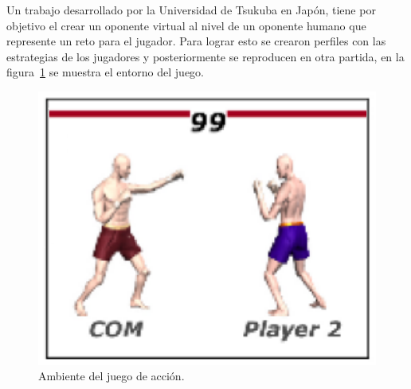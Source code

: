 
Un trabajo desarrollado por la Universidad de Tsukuba en
 Jap\'on\cite{Nakano2006}, tiene por objetivo el crear un oponente virtual
 al nivel de un oponente humano que represente un reto para el jugador. Para
 lograr esto se crearon perfiles con las estrategias de los jugadores y
 posteriormente se reproducen en otra partida, en la figura~\ref{fig:imitat}
 se muestra el entorno del juego.


\begin{figure}[h]
\centering
\includegraphics[width=0.5\columnwidth]{chap2/Imagenes/Imitating.eps}
\caption{Ambiente del juego de acci\'on.}
\label{fig:imitat}
\end{figure}